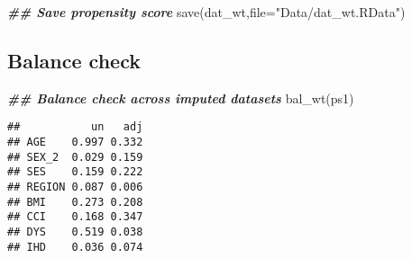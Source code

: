 \documentclass[
]{book}
\newenvironment{Shaded}{\begin{snugshade}}{\end{snugshade}}
\newcommand{\AttributeTok}[1]{\textcolor[rgb]{0.77,0.63,0.00}{#1}}
\newcommand{\ControlFlowTok}[1]{\textcolor[rgb]{0.13,0.29,0.53}{\textbf{#1}}}
\newcommand{\DecValTok}[1]{\textcolor[rgb]{0.00,0.00,0.81}{#1}}
\newcommand{\DocumentationTok}[1]{\textcolor[rgb]{0.56,0.35,0.01}{\textbf{\textit{#1}}}}
\newcommand{\FunctionTok}[1]{\textcolor[rgb]{0.00,0.00,0.00}{#1}}
\newcommand{\NormalTok}[1]{#1}
\newcommand{\OtherTok}[1]{\textcolor[rgb]{0.56,0.35,0.01}{#1}}
\newcommand{\SpecialCharTok}[1]{\textcolor[rgb]{0.00,0.00,0.00}{#1}}
\newcommand{\StringTok}[1]{\textcolor[rgb]{0.31,0.60,0.02}{#1}}
\begin{document}
\begin{Shaded}
\begin{Highlighting}[]
\DocumentationTok{\#\# Save propensity score}
\FunctionTok{save}\NormalTok{(dat\_wt,}\AttributeTok{file=}\StringTok{"Data/dat\_wt.RData"}\NormalTok{)}
\end{Highlighting}
\end{Shaded}

\hypertarget{balance-check-2}{%
\subsection{Balance check}\label{balance-check-2}}

\begin{Shaded}
\end{Shaded}

\begin{Shaded}
\begin{Highlighting}[]
\DocumentationTok{\#\# Balance check across imputed datasets}
\FunctionTok{bal\_wt}\NormalTok{(ps1)}
\end{Highlighting}
\end{Shaded}

\begin{verbatim}
##           un   adj
## AGE    0.997 0.332
## SEX_2  0.029 0.159
## SES    0.159 0.222
## REGION 0.087 0.006
## BMI    0.273 0.208
## CCI    0.168 0.347
## DYS    0.519 0.038
## IHD    0.036 0.074
\end{verbatim}
\end{document}
